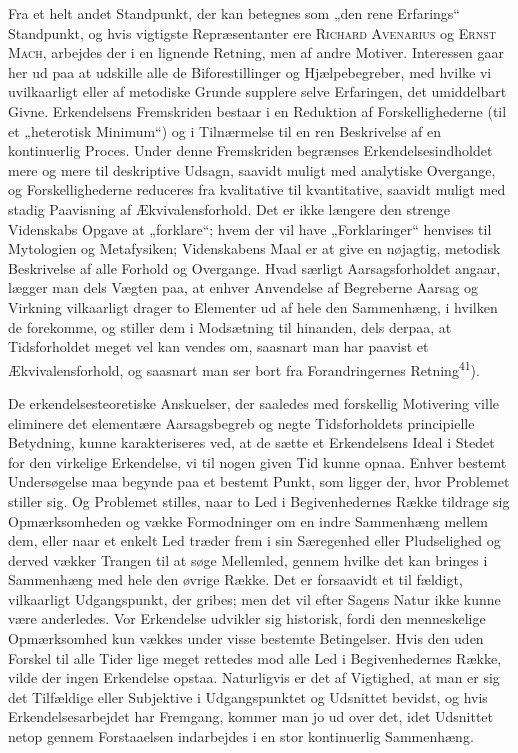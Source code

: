 \documentclass[12pt,a4paper,openany]{book}
\newcommand{\opage}[1]{\marginnote{\footnotesize\textit{[#1]}}}
\begin{document}
Fra et helt andet Standpunkt, der kan betegnes som „den
\opage{45}rene Erfarings“ Standpunkt, og hvis vigtigste Repræsentanter ere
\textsc{Richard Avenarius} og \textsc{Ernst Mach}, arbejdes der i en lignende
Retning, men af andre Motiver. Interessen gaar her ud paa at udskille alle de
Biforestillinger og Hjælpebegreber, med hvilke vi uvilkaarligt eller af
metodiske Grunde supplere selve Erfaringen, det umiddelbart Givne. Erkendelsens
Fremskriden bestaar i en Reduktion af Forskellighederne (til et „heterotisk
Minimum“) og i Tilnærmelse til en ren Beskrivelse af en kontinuerlig Proces.
Under denne Fremskriden begrænses Erkendelsesindholdet mere og mere til
deskriptive Udsagn, saavidt muligt med analytiske Overgange, og
Forskellighederne reduceres fra kvalitative til kvantitative, saavidt muligt
med stadig Paavisning af Ækvivalensforhold. Det er ikke længere den strenge
Videnskabs Opgave at „forklare“; hvem der vil have „Forklaringer“ henvises til
Mytologien og Metafysiken; Videnskabens Maal er at give en nøjagtig, metodisk
Beskrivelse af alle Forhold og Overgange. Hvad særligt Aarsagsforholdet angaar,
lægger man dels Vægten paa, at enhver Anvendelse af Begreberne Aarsag og
Virkning vilkaarligt drager to Elementer ud af hele den Sammenhæng, i hvilken
de forekomme, og stiller dem i Modsætning til hinanden, dels derpaa, at
Tidsforholdet meget vel kan vendes om, saasnart man har paavist et
Ækvivalensforhold, og saasnart man ser bort fra Forandringernes
Retning\textsuperscript{41}).

De erkendelsesteoretiske Anskuelser, der saaledes med forskellig Motivering
ville eliminere det elementære Aarsagsbegreb og negte Tidsforholdets
principielle Betydning, kunne karakteriseres ved, at de sætte et Erkendelsens
Ideal i Stedet for den virkelige Erkendelse, vi til nogen given Tid kunne
opnaa. Enhver bestemt Undersøgelse maa begynde paa et bestemt Punkt, som ligger
der, hvor Problemet stiller sig. Og Problemet stilles, naar to Led i
Begivenhedernes Række tildrage sig Opmærksomheden og vække Formodninger om en
indre Sammenhæng mellem dem, eller naar et enkelt Led træder frem i sin
Særegenhed eller Pludselighed og derved vækker Trangen til at søge Mellemled,
gennem hvilke det kan bringes i Sammenhæng med hele den øvrige Række. Det er
forsaavidt et til%
\opage{46}fældigt, vilkaarligt Udgangspunkt, der gribes; men det vil efter
Sagens Natur ikke kunne være anderledes. Vor Erkendelse udvikler sig historisk,
fordi den menneskelige Opmærksomhed kun vækkes under visse bestemte
Betingelser. Hvis den uden Forskel til alle Tider lige meget rettedes mod alle
Led i Begivenhedernes Række, vilde der ingen Erkendelse opstaa. Naturligvis er
det af Vigtighed, at man er sig det Tilfældige eller Subjektive i
Udgangspunktet og Udsnittet bevidst, og hvis Erkendelsesarbejdet har Fremgang,
kommer man jo ud over det, idet Udsnittet netop gennem Forstaaelsen indarbejdes
i en stor kontinuerlig Sammenhæng.
\end{document}
